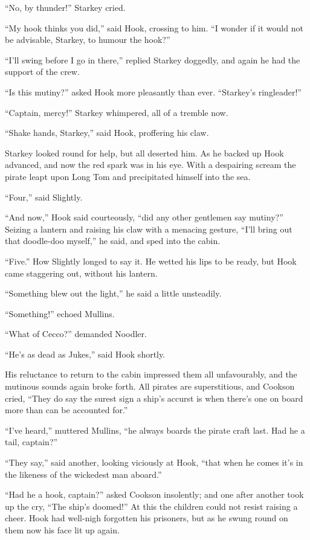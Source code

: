 “No, by thunder!\@” Starkey cried.

“My hook thinks you did,” said Hook, crossing to him.
“I wonder if it would not be advisable, Starkey, to humour the hook?”

“I’ll swing before I go in there,” replied Starkey doggedly,
and again he had the support of the crew.

“Is this mutiny?\@” asked Hook more pleasantly than ever.
“Starkey’s ringleader!”

“Captain, mercy!\@” Starkey whimpered, all of a tremble now.

“Shake hands, Starkey,” said Hook, proffering his claw.

Starkey looked round for help, but all deserted him.
As he backed up Hook advanced, and now the red spark was in his eye.
With a despairing scream the pirate leapt upon Long Tom and precipitated himself into the sea.

“Four,” said Slightly.

“And now,” Hook said courteously, “did any other gentlemen say mutiny?”
Seizing a lantern and raising his claw with a menacing gesture,
“I’ll bring out that doodle-doo myself,” he said, and sped into the cabin.

“Five.”
How Slightly longed to say it.
He wetted his lips to be ready, but Hook came staggering out, without his lantern.

“Something blew out the light,” he said a little unsteadily.

“Something!\@” echoed Mullins.

“What of Cecco?\@” demanded Noodler.

“He’s as dead as Jukes,” said Hook shortly.

His reluctance to return to the cabin impressed them all unfavourably,
and the mutinous sounds again broke forth.
All pirates are superstitious, and Cookson cried,
“They do say the surest sign a ship’s accurst is when there’s one on board more than can be accounted for.”

“I’ve heard,” muttered Mullins, “he always boards the pirate craft last.
Had he a tail, captain?”

“They say,” said another, looking viciously at Hook,
“that when he comes it’s in the likeness of the wickedest man aboard.”

“Had he a hook, captain?\@” asked Cookson insolently;
and one after another took up the cry, “The ship’s doomed!”
At this the children could not resist raising a cheer.
Hook had well-nigh forgotten his prisoners,
but as he swung round on them now his face lit up again.

